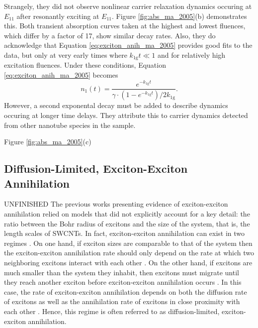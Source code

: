 Strangely, they did not observe nonlinear carrier relaxation dynamics occuring at $E_{11}$ after resonantly exciting at $E_{11}$. Figure \ref{fig:abs_ma_2005}(b) demonstrates this. Both transient absorption curves taken at the highest and lowest fluences, which differ by a factor of 17, show similar decay rates. Also, they do acknowledge that Equation \eqref{eq:exciton_anih_ma_2005} provides good fits to the data, but only at very early times where $k_\text{1g} t \ll 1$ and for relatively high excitation fluences. Under these conditions, Equation \eqref{eq:exciton_anih_ma_2005} becomes
\begin{equation}
		n_1(t) = \frac{e^{-k_\text{1g}t}}{\gamma\cdot(1 - e^{-k_\text{1g}t} )/2k_\text{1g}}.
\end{equation}
However, a second exponental decay must be added to describe dynamics occuring at longer time delays. They attribute this to carrier dynamics detected from other nanotube species in the sample.

 Figure \ref{fig:abs_ma_2005}(c)

\subsection{Diffusion-Limited, Exciton-Exciton Annihilation}
{\color{red} UNFINISHED} The previous works presenting evidence of exciton-exciton annihilation relied on models that did not explicitly account for a key detail: the ratio between the Bohr radius of excitons and the size of the system, that is, the length scales of SWCNTs. In fact, exciton-exciton annihilation can exist in two regimes \cite{valkunas2006exciton}. On one hand, if exciton sizes are comparable to that of the system then the exciton-exciton annihilation rate should only depend on the rate at which two neighboring excitons interact with each other \cite{valkunas2006exciton}. On the other hand, if excitons are much smaller than the system they inhabit, then excitons must migrate until they reach another exciton before exciton-exciton annihilation occurs \cite{valkunas2006exciton}. In this case, the rate of exciton-exciton annihilation depends on both the diffusion rate of excitons as well as the annihilation rate of excitons in close proximity with each other \cite{valkunas2006exciton}. Hence, this regime is often referred to as diffusion-limited, exciton-exciton annihilation.

